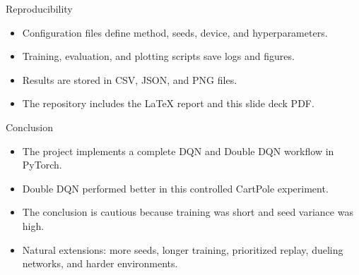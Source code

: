 \documentclass[aspectratio=169]{beamer}
\begin{document}
\begin{frame}{Reproducibility}
\begin{itemize}
  \item Configuration files define method, seeds, device, and hyperparameters.
  \item Training, evaluation, and plotting scripts save logs and figures.
  \item Results are stored in CSV, JSON, and PNG files.
  \item The repository includes the LaTeX report and this slide deck PDF.
\end{itemize}
\end{frame}

\begin{frame}{Conclusion}
\begin{itemize}
  \item The project implements a complete DQN and Double DQN workflow in PyTorch.
  \item Double DQN performed better in this controlled CartPole experiment.
  \item The conclusion is cautious because training was short and seed variance was high.
  \item Natural extensions: more seeds, longer training, prioritized replay, dueling networks, and harder environments.
\end{itemize}
\end{frame}
\end{document}

